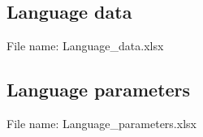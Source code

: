 \documentclass[12pt,a4paper]{scrartcl}
\begin{document}
\newpage%
\subsection{Language data}

File name: Language\_data.xlsx

\noindent{}

\newpage%
\subsection{Language parameters}

File name: Language\_parameters.xlsx

\noindent{}
\end{document}
